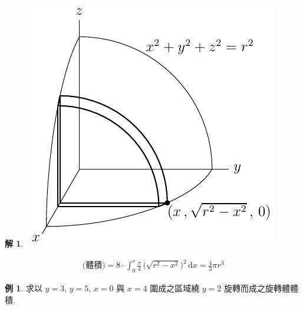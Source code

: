 \documentclass[12pt]{extarticle}
\theoremstyle{definition}
\newtheorem*{ex}{例}
\newtheorem*{sol}{解}
\begin{document}
\begin{sol}
  \begin{minipage}{.3\textwidth}
    \includegraphics[scale=.7]{sphereSlice} 
  \end{minipage}
  \begin{minipage}{.65\textwidth}
    \begin{align*}
      \text{(體積)} = 8\cdot\int_0^r\!\frac{\pi}{4}\,\big(\sqrt{r^2 - x^2}\big)^2\,\text{d}x = \frac{4}{3}\pi r^3
    \end{align*}
  \end{minipage}
\end{sol}

\begin{ex}
  求以 $y = 3$, $y = 5$, $x = 0$ 與 $x = 4$ 圍成之區域繞 $y = 2$ 旋轉而成之旋轉體體積.
\end{ex}
\end{document}
